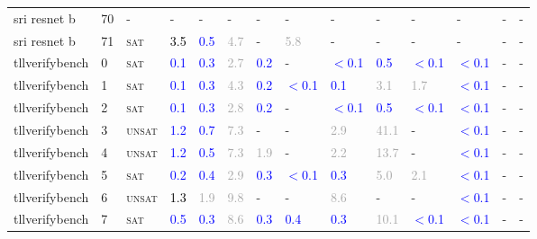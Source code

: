 \begin{center}
{\begin{longtable}{@{}llllllllllllll@{}}
sri resnet b & 70 & - & - & - & - & - & - & - & - & - & - & - & - \\
sri resnet b & 71 & \textsc{sat} & \textcolor{black}{3.5} & \textcolor{blue}{0.5} & \textcolor{darkgray}{4.7} & - & \textcolor{darkgray}{5.8} & - & - & - & - & - & - \\
tllverifybench & 0 & \textsc{sat} & \textcolor{blue}{0.1} & \textcolor{blue}{0.3} & \textcolor{darkgray}{2.7} & \textcolor{blue}{0.2} & - & \textcolor{blue}{$<$0.1} & \textcolor{blue}{0.5} & \textcolor{blue}{$<$0.1} & \textcolor{blue}{$<$0.1} & - & - \\
tllverifybench & 1 & \textsc{sat} & \textcolor{blue}{0.1} & \textcolor{blue}{0.3} & \textcolor{darkgray}{4.3} & \textcolor{blue}{0.2} & \textcolor{blue}{$<$0.1} & \textcolor{blue}{0.1} & \textcolor{darkgray}{3.1} & \textcolor{darkgray}{1.7} & \textcolor{blue}{$<$0.1} & - & - \\
tllverifybench & 2 & \textsc{sat} & \textcolor{blue}{0.1} & \textcolor{blue}{0.3} & \textcolor{darkgray}{2.8} & \textcolor{blue}{0.2} & - & \textcolor{blue}{$<$0.1} & \textcolor{blue}{0.5} & \textcolor{blue}{$<$0.1} & \textcolor{blue}{$<$0.1} & - & - \\
tllverifybench & 3 & \textsc{unsat} & \textcolor{blue}{1.2} & \textcolor{blue}{0.7} & \textcolor{darkgray}{7.3} & - & - & \textcolor{darkgray}{2.9} & \textcolor{darkgray}{41.1} & - & \textcolor{blue}{$<$0.1} & - & - \\
tllverifybench & 4 & \textsc{unsat} & \textcolor{blue}{1.2} & \textcolor{blue}{0.5} & \textcolor{darkgray}{7.3} & \textcolor{darkgray}{1.9} & - & \textcolor{darkgray}{2.2} & \textcolor{darkgray}{13.7} & - & \textcolor{blue}{$<$0.1} & - & - \\
tllverifybench & 5 & \textsc{sat} & \textcolor{blue}{0.2} & \textcolor{blue}{0.4} & \textcolor{darkgray}{2.9} & \textcolor{blue}{0.3} & \textcolor{blue}{$<$0.1} & \textcolor{blue}{0.3} & \textcolor{darkgray}{5.0} & \textcolor{darkgray}{2.1} & \textcolor{blue}{$<$0.1} & - & - \\
tllverifybench & 6 & \textsc{unsat} & \textcolor{black}{1.3} & \textcolor{darkgray}{1.9} & \textcolor{darkgray}{9.8} & - & - & \textcolor{darkgray}{8.6} & - & - & \textcolor{blue}{$<$0.1} & - & - \\
tllverifybench & 7 & \textsc{sat} & \textcolor{blue}{0.5} & \textcolor{blue}{0.3} & \textcolor{darkgray}{8.6} & \textcolor{blue}{0.3} & \textcolor{blue}{0.4} & \textcolor{blue}{0.3} & \textcolor{darkgray}{10.1} & \textcolor{blue}{$<$0.1} & \textcolor{blue}{$<$0.1} & - & - \\

\end{longtable}}
\end{center}
